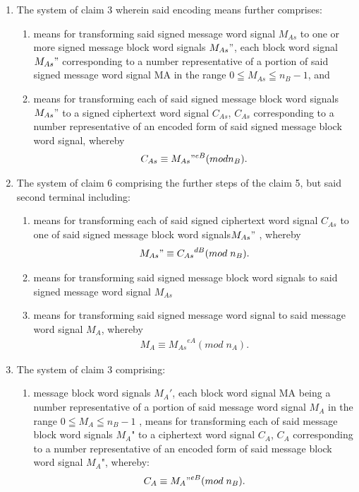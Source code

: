 \documentclass[12pt, a4paper]{article}
\begin{document}
\begin{enumerate}
	\item
	The system of claim 3 wherein said encoding means further comprises:
		\begin{enumerate}
			\item
			means for transforming said signed message word signal $M_{As}$ to one or more signed message block word signals ${M_{As}}"$, each block word signal ${M_{As}}"$ corresponding to a number representative of a portion of said signed message word signal MA in the range $0 \leqq M_{As} \leqq n_B-1$, and
			\item
			means for transforming each of said signed message block word signals ${M_{As}}"$ to a signed ciphertext word signal $C_{As}$, $C_{As}$ corresponding to a number representative of an encoded form of said signed message block word signal, whereby
			\begin{gather*}
				C_{As}  \equiv M_{As}"^{eB} (mod n_B).
			\end{gather*}	
		\end{enumerate}
		
		\item
		The system of claim 6 comprising the further steps of the claim 5, but said second terminal including:
		\begin{enumerate}
			\item	
		means for transforming each of said signed ciphertext word signal $C_{As}$ to one of said signed message block word signals${M_{As}}"$ , whereby
			\begin{gather*}
				M_{As}"  \equiv {C_{As}}^{dB} (mod \; n_B).
			\end{gather*}
			\item
means for transforming said signed message block word signals to said signed message word signal $M_{As}$
			\item
means for transforming said signed message word signal to said message word signal $M_A$, whereby
			\begin{gather*}
				M_A  \equiv {M_{As}}^{eA} (mod \; n_A).
			\end{gather*}
		\end{enumerate}
	
	\item
	The system of claim 3 comprising:
		\begin{enumerate}
			\item
			message block word signals $M_A'$, each block word signal MA being a number representative of a portion of said message word signal $M_A$ in the range $0 \leqq M_A \leqq n_B - 1$ , means for transforming each of said message block word signals $M_A$" to a ciphertext word signal $C_A$, $C_A$ corresponding to a number representative of an encoded form of said message block word signal $M_A$", whereby:
			\begin{gather*}
				C_A  \equiv {M_{A}"}^{eB} (mod \; n_B).
			\end{gather*}
		\end{enumerate}


\end{enumerate}
\end{document}
